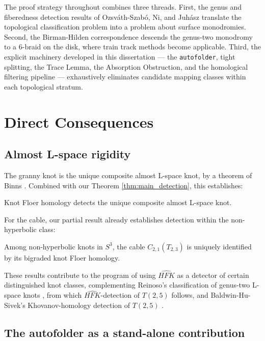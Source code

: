 The proof strategy throughout combines three threads. First, the genus and fiberedness detection results of Ozsv\'{a}th-Szab\'{o}, Ni, and Juh\'{a}sz translate the topological classification problem into a problem about surface monodromies. Second, the Birman-Hilden correspondence descends the genus-two monodromy to a 6-braid on the disk, where train track methods become applicable. Third, the explicit machinery developed in this dissertation — the \texttt{autofolder}, tight splitting, the Trace Lemma, the Absorption Obstruction, and the homological filtering pipeline — exhaustively eliminates candidate mapping classes within each topological stratum.

\section{Direct Consequences}

\subsection{Almost L-space rigidity}

The granny knot is the unique composite almost L-space knot, by a theorem of Binns \cite{Binns2023}. Combined with our Theorem \ref{thm:main_detection}, this establishes:

\begin{corollary}
Knot Floer homology detects the unique composite almost L-space knot.
\end{corollary}

For the cable, our partial result already establishes detection within the non-hyperbolic class:

\begin{corollary}
Among non-hyperbolic knots in $S^3$, the cable $C_{2,1}(T_{2,3})$ is uniquely identified by its bigraded knot Floer homology.
\end{corollary}

These results contribute to the program of using $\widehat{HFK}$ as a detector of certain distinguished knot classes, complementing Reinoso's classification of genus-two L-space knots \cite{Reinoso2023}, from which $\widehat{HFK}$-detection of $T(2,5)$ follows, and Baldwin-Hu-Sivek's Khovanov-homology detection of $T(2,5)$ \cite{baldwin2025khovanov}.

\subsection{The autofolder as a stand-alone contribution}

